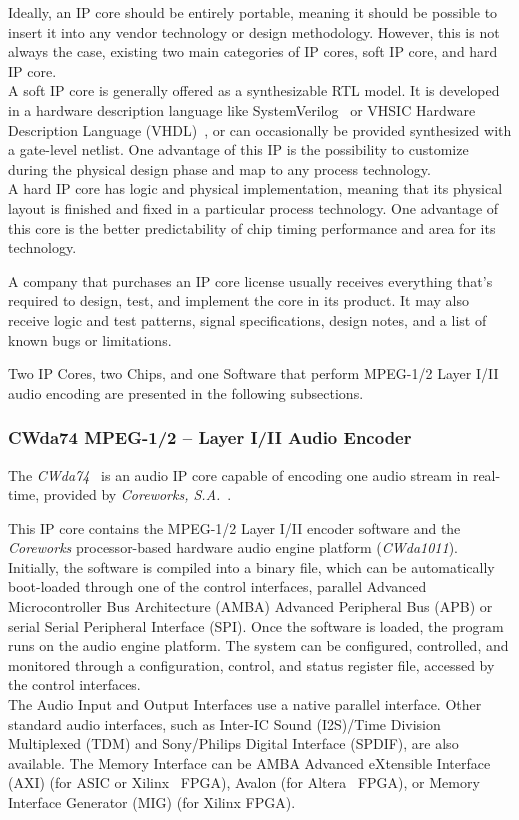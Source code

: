 Ideally, an IP core should be entirely portable, meaning it should be possible to insert it into any vendor technology or design methodology. However, this is not always the case, existing two main categories of IP cores, soft IP core, and hard IP core.\\
A soft IP core is generally offered as a synthesizable RTL model. It is developed in a hardware description language like SystemVerilog~\cite{ieee:systemVerilog} or VHSIC Hardware Description Language (VHDL)~\cite{ieee:vhdl}, or can occasionally be provided synthesized with a gate-level netlist. One advantage of this IP is the possibility to customize during the physical design phase and map to any process technology.\\
A hard IP core has logic and physical implementation, meaning that its physical layout is finished and fixed in a particular process technology.
One advantage of this core is the better predictability of chip timing performance and area for its technology. 

A company that purchases an IP core license usually receives everything that's required to design, test, and implement the core in its product. It may also receive logic and test patterns, signal specifications, design notes, and a list of known bugs or limitations.

Two IP Cores, two Chips, and one Software that perform MPEG-1/2 Layer I/II audio encoding are presented in the following subsections.

\subsubsection{CWda74 MPEG-1/2 – Layer I/II Audio Encoder}
 
The \textit{CWda74}~\cite{CWda74} is an audio IP core capable of encoding one audio stream in real-time, provided by \textit{Coreworks, S.A.}~\cite{coreworks}.

This IP core contains the MPEG-1/2 Layer I/II encoder software and the \textit{Coreworks} processor-based hardware audio engine platform (\textit{CWda1011}).\\
Initially, the software is compiled into a binary file, which can be automatically boot-loaded through one of the control interfaces, parallel Advanced Microcontroller Bus Architecture (AMBA) Advanced Peripheral Bus (APB) or serial Serial Peripheral Interface (SPI). 
Once the software is loaded, the program runs on the audio engine platform. The system can be configured, controlled, and monitored through a configuration, control, and status register file, accessed by the control interfaces. \\
The Audio Input and Output Interfaces use a native parallel interface. Other standard audio interfaces, such as Inter-IC Sound (I2S)/Time Division Multiplexed (TDM) and Sony/Philips Digital Interface (SPDIF), are also available.
The Memory Interface can be AMBA Advanced eXtensible Interface (AXI) (for ASIC or Xilinx~\cite{xilinx} FPGA), Avalon (for Altera~\cite{intel} FPGA), or Memory Interface Generator (MIG) (for Xilinx FPGA).


